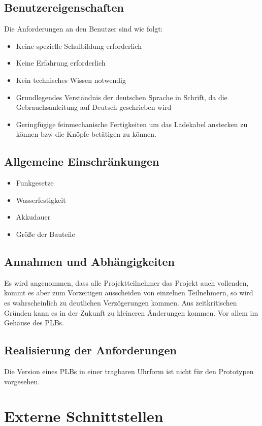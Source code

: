 \subsection{Benutzereigenschaften}
Die Anforderungen an den Benutzer sind wie folgt:
\begin{itemize}
	\item Keine spezielle Schulbildung erforderlich
	\item Keine Erfahrung erforderlich
	\item Kein technisches Wissen notwendig
	\item Grundlegendes Verständnis der deutschen Sprache in Schrift, da die Gebrauchsanleitung auf Deutsch geschrieben wird
	\item Geringfügige feinmechanische Fertigkeiten um das Ladekabel anstecken zu können bzw die Knöpfe betätigen zu können.
\end{itemize}

\subsection{Allgemeine Einschränkungen}

\begin{itemize}
	\item Funkgesetze
	\item Wasserfestigkeit
	\item Akkudauer 
	\item Größe der Bauteile 
\end{itemize}

\subsection{Annahmen und Abhängigkeiten}
Es wird angenommen, dass alle Projektteilnehmer das Projekt auch vollenden, kommt es aber zum Vorzeitigen ausscheiden von einzelnen Teilnehmern, so wird es wahrscheinlich zu deutlichen Verzögerungen kommen. Aus zeitkritischen Gründen kann es in der Zukunft zu kleineren Änderungen kommen. Vor allem im Gehäuse des PLBs.

\subsection{Realisierung der Anforderungen}
Die Version eines PLBs in einer tragbaren Uhrform ist nicht für den Prototypen vorgesehen.

\newpage

\section{Externe Schnittstellen}

